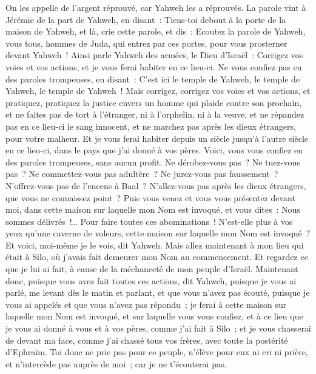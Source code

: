 \begin{multicols}{2}
On les appelle de l'argent réprouvé, car Yahweh les a réprouvés.
\VerseOne{}La parole vint à Jérémie de la part de Yahweh, en disant~:
Tiens-toi debout à la porte de la maison de Yahweh, et là, crie cette parole, et dis~: Ecoutez la parole de Yahweh, vous tous, hommes de Juda, qui entrez par ces portes, pour vous prosterner devant Yahweh~!
Ainsi parle Yahweh des armées, le Dieu d'Israël~: Corrigez vos voies et vos actions, et je vous ferai habiter en ce lieu-ci.
Ne vous confiez pas en des paroles trompeuses, en disant~: C'est ici le temple de Yahweh, le temple de Yahweh, le temple de Yahweh~!
Mais corrigez, corrigez vos voies et vos actions, et pratiquez, pratiquez la justice envers un homme qui plaide contre son prochain,
et ne faites pas de tort à l'étranger, ni à l'orphelin, ni à la veuve, et ne répandez pas en ce lieu-ci le sang innocent, et ne marchez pas après les dieux étrangers, pour votre malheur.
Et je vous ferai habiter depuis un siècle jusqu'à l'autre siècle en ce lieu-ci, dans le pays que j'ai donné à vos pères.
Voici, vous vous confiez en des paroles trompeuses, sans aucun profit.
Ne dérobez-vous pas~? Ne tuez-vous pas~? Ne commettez-vous pas adultère~? Ne jurez-vous pas faussement~? N'offrez-vous pas de l'encens à Baal~? N'allez-vous pas après les dieux étrangers, que vous ne connaissez point~?
Puis vous venez et vous vous présentez devant moi, dans cette maison sur laquelle mon Nom est invoqué, et vous dites~: Nous sommes délivrés~!… Pour faire toutes ces abominations~!
N'est-elle plus à vos yeux qu'une caverne de voleurs, cette maison sur laquelle mon Nom est invoqué~? Et voici, moi-même je le vois, dit Yahweh.
Mais allez maintenant à mon lieu qui était à Silo, où j'avais fait demeurer mon Nom au commencement. Et regardez ce que je lui ai fait, à cause de la méchanceté de mon peuple d'Israël.
Maintenant donc, puisque vous avez fait toutes ces actions, dit Yahweh, puisque je vous ai parlé, me levant dès le matin et parlant, et que vous n'avez pas écouté, puisque je vous ai appelés et que vous n'avez pas répondu~;
je ferai à cette maison sur laquelle mon Nom est invoqué, et sur laquelle vous vous confiez, et à ce lieu que je vous ai donné à vous et à vos pères, comme j'ai fait à Silo~;
et je vous chasserai de devant ma face, comme j'ai chassé tous vos frères, avec toute la postérité d'Ephraïm.
Toi donc ne prie pas pour ce peuple, n'élève pour eux ni cri ni prière, et n'intercède pas auprès de moi~; car je ne t'écouterai pas.

\end{multicols}
